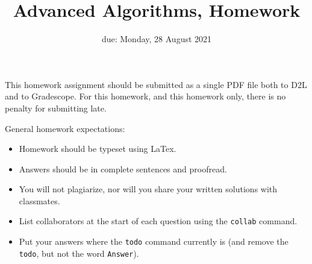 \documentclass{article}
\title{Advanced Algorithms, Homework \hwnum}
\author{\todo{Your Name Here}}
\date{due: Monday, 28 August 2021}
\begin{document}
\maketitle

This homework assignment should be
submitted as a single PDF file both to D2L and to Gradescope.  For this
homework, and this homework only, there is no penalty for submitting late.

General homework expectations:
\begin{itemize}
    \item Homework should be typeset using LaTex.
    \item Answers should be in complete sentences and proofread.
    \item You will not plagiarize, nor will you share your written solutions
        with classmates.
    \item List collaborators at the start of each question using the
        \texttt{collab} command.
    \item Put your answers where the \texttt{todo} command currently is (and
        remove the \texttt{todo}, but not the word \texttt{Answer}).
\end{itemize}

\end{document}
